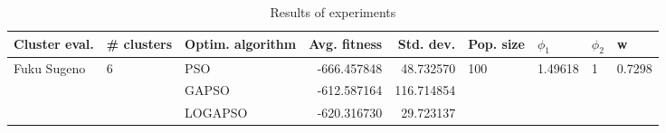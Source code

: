\begin{table}
\centering
\caption{Results of experiments}
\begin{tabular}{lllrrllll}
\toprule
               Cluster eval. &        \# clusters & Optim. algorithm &  Avg. fitness &  Std. dev. &            Pop. size &               $\phi_{1}$ &         $\phi_{2}$ &                       w \\
\midrule
\multirow{3}{*}{Fuku Sugeno} & \multirow{3}{*}{6} &              PSO &   -666.457848 &  48.732570 & \multirow{3}{*}{100} & \multirow{3}{*}{1.49618} & \multirow{3}{*}{1} & \multirow{3}{*}{0.7298} \\
                             &                    &            GAPSO &   -612.587164 & 116.714854 &                      &                          &                    &                         \\
                             &                    &          LOGAPSO &   -620.316730 &  29.723137 &                      &                          &                    &                         \\
\bottomrule
\end{tabular}
\end{table}
